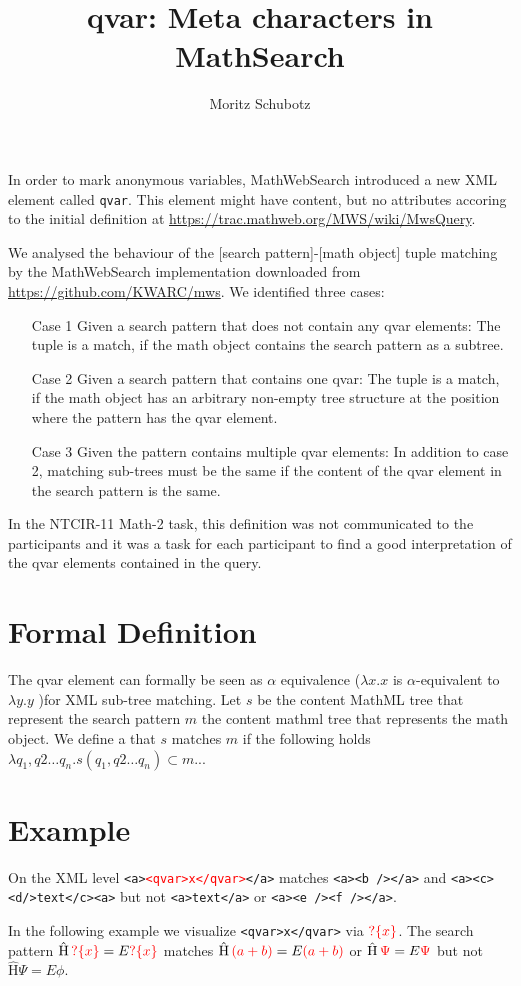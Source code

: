 \documentclass[11pt]{bluenote}
\title{qvar: Meta characters in MathSearch}
\author{Moritz Schubotz}
\begin{document}
\maketitle
In order to mark anonymous variables, MathWebSearch introduced a new XML element called \texttt{qvar}.
This element might have content, but no attributes accoring to the initial definition at \url{https://trac.mathweb.org/MWS/wiki/MwsQuery}.

We analysed the behaviour of the [search pattern]-[math object] tuple matching by the MathWebSearch implementation downloaded from \url{https://github.com/KWARC/mws}. We identified three cases:
\begin{enumerate}
\item[Case 1] Given a search pattern that does not contain any qvar elements: The tuple is a match, if the math object contains the search pattern as a subtree.
\item[Case 2] Given a search pattern that contains one qvar: The tuple is a match, if the math object has an arbitrary non-empty tree structure at the position where the pattern has the qvar element.
\item[Case 3] Given the pattern contains multiple qvar elements: In addition to case 2, matching sub-trees must be the same if the content of the qvar element in the search pattern is the same.
\end{enumerate}

In the NTCIR-11 Math-2 task, this definition was not communicated to the participants and it was a task for each participant to find a good interpretation of the qvar elements contained in the query.
\section{Formal Definition}
The qvar element can formally be seen as $\alpha$ equivalence ($\lambda x.x$ is $\alpha$-equivalent to $\lambda y.y$ )for XML sub-tree matching.
Let $s$ be the content MathML tree that represent the search pattern $m$ the content mathml tree that represents the math object.
We define a that $s$ matches $m$ if the following holds
$\lambda q_1,q2\dots q_n. s(q_1,q2\dots q_n)\subset m$...
\section{Example}
On the XML level \texttt{<a>\textcolor{red}{<qvar>x</qvar>}</a>} matches \texttt{<a><b /></a>} and \texttt{<a><c><d/>text</c><a>} but not \texttt{<a>text</a>} or \texttt{<a><e /><f /></a>}.

\newcommand{\qvar}[1]{\ensuremath{\textcolor{red}{?\{#1\}}}}
In the following example we visualize \texttt{<qvar>x</qvar>} via \qvar{x}. The search pattern
$\operatorname{\hat H}\qvar{x}=E\qvar{x}$ matches $\operatorname{\hat H}\textcolor{red}{(a+b)}=E\textcolor{red}{(a+b)}$ or $\operatorname{\hat H}\textcolor{red}{\Psi}=E\textcolor{red}{\Psi}$ but not $\operatorname{\hat H}\Psi=E\phi$.
\end{document}
